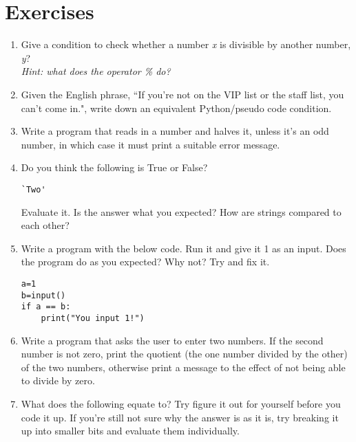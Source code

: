 \section{Exercises}
\begin{enumerate}
	\item Give a condition to check whether a number \textit{x} is divisible by another number, \textit{y}? 
\\\textit{Hint: what does the operator \textit{\%} do?}
	\item Given the English phrase, ``If you're not on the VIP list or    the staff list, you can't come in.", write down an equivalent Python/pseudo code    condition.
	\item Write a program that reads in a number and halves it, unless it's an odd number, in which case it must print a suitable error  message.
	\item Do you think the following is True or False?    
\begin{lstlisting}
`Two' 
\end{lstlisting}
			Evaluate it. Is the answer what you expected? How are strings compared to each other?
\item Write a program with the below code. Run it and give it 1 as an input. Does the program do as you expected? Why not? Try and fix it.
\begin{lstlisting}
a=1
b=input()
if a == b:
	print("You input 1!")
\end{lstlisting}
\item Write a program that asks the user to enter two numbers. If the
			second number is not zero, print the quotient (the one number divided by the other) of the two numbers,
			otherwise print a message to the effect of not being able to divide
			by zero.
	\item What does the following equate to? Try figure it out for yourself before you code it up. If you're still not sure why the answer is as it is, try breaking it up into smaller bits and evaluate them individually.
			 

\end{enumerate}
